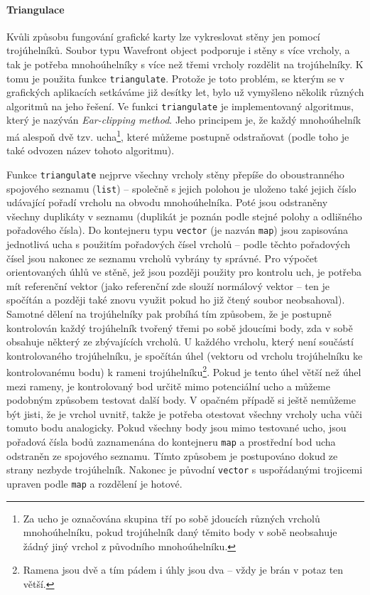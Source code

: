 \documentclass[a4paper, 12pt]{report}
\begin{document}
\paragraph{Triangulace}
Kvůli způsobu fungování grafické karty lze vykreslovat stěny jen pomocí trojúhelníků. Soubor typu Wavefront object podporuje i stěny s více vrcholy, a tak je potřeba mnohoúhelníky s více než třemi vrcholy rozdělit na trojúhelníky. K tomu je použita funkce \texttt{triangulate}. Protože je toto problém, se kterým se v grafických aplikacích setkáváme již desítky let, bylo už vymyšleno několik různých algoritmů na jeho řešení\cite{wiki:triangulation}. Ve funkci \texttt{triangulate} je implementovaný algoritmus, který je nazýván \emph{Ear-clipping method}. Jeho principem je, že každý mnohoúhelník má alespoň dvě tzv. ucha\footnote{Za ucho je označována skupina tří po sobě jdoucích různých vrcholů mnohoúhelníku, pokud trojúhelník daný těmito body v sobě neobsahuje žádný jiný vrchol z původního mnohoúhelníku.}, které můžeme postupně odstraňovat (podle toho je také odvozen název tohoto algoritmu).

Funkce \texttt{triangulate} nejprve všechny vrcholy stěny přepíše do oboustranného spojového seznamu (\texttt{list}) -- společně s jejich polohou je uloženo také jejich číslo udávající pořadí vrcholu na obvodu mnohoúhelníka. Poté jsou odstraněny všechny duplikáty v seznamu (duplikát je poznán podle stejné polohy a odlišného pořadového čísla). Do kontejneru typu \texttt{vector} (je nazván \texttt{map}) jsou zapisována jednotlivá ucha s použitím pořadových čísel vrcholů -- podle těchto pořadových čísel jsou nakonec ze seznamu vrcholů vybrány ty správné. Pro výpočet orientovaných úhlů ve stěně, jež jsou později použity pro kontrolu uch, je potřeba mít referenční vektor (jako referenční zde slouží normálový vektor -- ten je spočítán a později také znovu využit pokud ho již čtený soubor neobsahoval). Samotné dělení na trojúhelníky pak probíhá tím způsobem, že je postupně kontrolován každý trojúhelník tvořený třemi po sobě jdoucími body, zda v sobě obsahuje některý ze zbývajících vrcholů. U každého vrcholu, který není součástí kontrolovaného trojúhelníku, je spočítán úhel (vektoru od vrcholu trojúhelníku ke kontrolovanému bodu) k rameni trojúhelníku\footnote{Ramena jsou dvě a tím pádem i úhly jsou dva -- vždy je brán v potaz ten větší.}. Pokud je tento úhel větší než úhel mezi rameny, je kontrolovaný bod určitě mimo potenciální ucho a můžeme podobným způsobem testovat další body. V opačném případě si ještě nemůžeme být jisti, že je vrchol uvnitř, takže je potřeba otestovat všechny vrcholy ucha vůči tomuto bodu analogicky. Pokud všechny body jsou mimo testované ucho, jsou pořadová čísla bodů zaznamenána do kontejneru \texttt{map} a prostřední bod ucha odstraněn ze spojového seznamu. Tímto způsobem je postupováno dokud ze strany nezbyde trojúhelník. Nakonec je původní \texttt{vector} s uspořádanými trojicemi upraven podle \texttt{map} a rozdělení je hotové.
\end{document}
